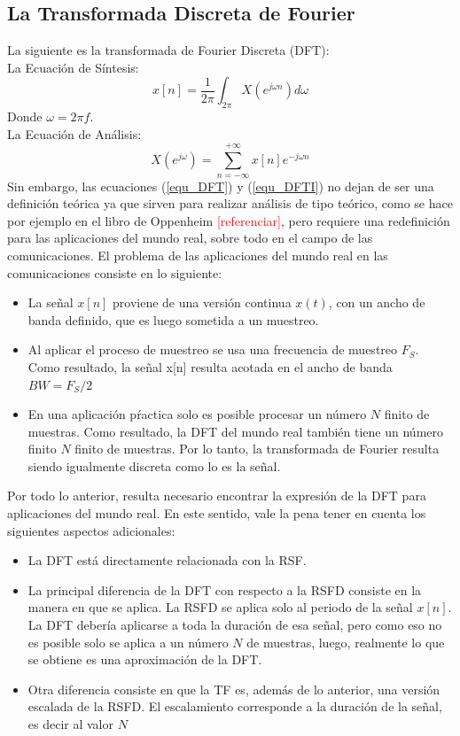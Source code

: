 \subsection{La Transformada Discreta de Fourier}
La siguiente es la transformada de Fourier Discreta (DFT):\\
La Ecuación de Síntesis:
\begin{equation} \label{equ_DFT}
			 x[n] = \dfrac{1}{2\pi} \int_{2\pi}{X(e^{j\omega n})d\omega}		
\end{equation}	
Donde $\omega=2\pi f$.\\
La Ecuación de Análisis:
\begin{equation} \label{equ_DFTI}
			 X(e^{j\omega}) =  \sum_{n=-\infty}^{+\infty} {x[n]e^{-j\omega n}}		
\end{equation}
Sin embargo, las ecuaciones (\ref{equ_DFT}) y (\ref{equ_DFTI}) no dejan de ser una definición teórica ya que sirven para realizar análisis de tipo teórico, como se hace por ejemplo en el libro de Oppenheim \cite{Mejia2012} \textcolor{red}{[referenciar]}, pero requiere una redefinición para las aplicaciones del mundo real, sobre todo en el campo de las comunicaciones. El problema de las aplicaciones del mundo real en las comunicaciones consiste en lo siguiente:
\begin{itemize}
    \item La señal $x[n]$ proviene de una versión continua $x(t)$, con un ancho de banda definido, que es luego sometida a un muestreo.
    \item Al aplicar el proceso de muestreo se usa una frecuencia de muestreo $F_S$. Como resultado, la señal x[n] resulta acotada en el ancho de banda $BW=F_S/2$  
    \item En una aplicación pŕactica solo es posible procesar un número $N$ finito de muestras. Como resultado, la DFT del mundo real también tiene un número finito $N$ finito de muestras. Por lo tanto, la transformada de Fourier resulta siendo igualmente discreta como lo es la señal.
\end{itemize}
Por todo lo anterior, resulta necesario encontrar la expresión de la  DFT para aplicaciones del mundo real. En este sentido, vale la pena tener en cuenta los siguientes aspectos adicionales:
\begin{itemize}
    \item La DFT está directamente relacionada con la RSF.
    \item La principal diferencia de la DFT con respecto a la RSFD consiste en la manera en que se aplica. La  RSFD se aplica solo al periodo de la señal $x[n]$. La DFT debería aplicarse a toda la duración de esa señal, pero como eso no es posible solo se aplica a un número $N$ de muestras, luego, realmente lo que se obtiene es una aproximación de la DFT.
    \item Otra diferencia consiste en que la TF es, además de lo anterior, una versión escalada de la RSFD. El escalamiento corresponde a la duración de la señal, es decir al valor $N$
\end{itemize}
